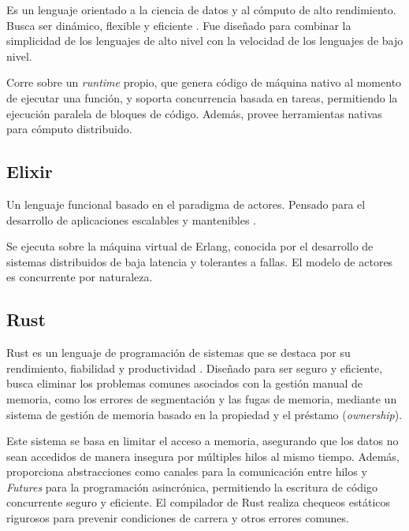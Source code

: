 \documentclass[11pt]{article}
\let\Oldsubsection\subsection
\renewcommand{\subsection}{\FloatBarrier\Oldsubsection}
\newcommand{\english}[1]{\textit{#1}}
\begin{document}
Es un lenguaje orientado a la ciencia de datos y al cómputo de alto rendimiento. Busca ser dinámico, flexible y eficiente \cite{com:julia}. Fue diseñado para combinar la simplicidad de los lenguajes de alto nivel con la velocidad de los lenguajes de bajo nivel.

Corre sobre un \english{runtime} propio, que genera código de máquina nativo al momento de  ejecutar una función, y soporta concurrencia basada en tareas, permitiendo la ejecución paralela de bloques de código. Además, provee herramientas nativas para cómputo distribuido.

\subsection{Elixir}

Un lenguaje funcional basado en el paradigma de actores. Pensado para el desarrollo de aplicaciones escalables y mantenibles \cite{com:elixir}.

Se ejecuta sobre la máquina virtual de Erlang, conocida por el desarrollo de sistemas distribuidos de baja latencia y tolerantes a fallas. El modelo de actores es concurrente por naturaleza.

\subsection{Rust}

Rust es un lenguaje de programación de sistemas que se destaca por su rendimiento, fiabilidad y productividad \cite{com:rust}. Diseñado para ser seguro y eficiente, busca eliminar los problemas comunes asociados con la gestión manual de memoria, como los errores de segmentación y las fugas de memoria, mediante un sistema de gestión de memoria basado en la propiedad y el préstamo (\english{ownership}).

Este sistema se basa en limitar el acceso a memoria, asegurando que los datos no sean accedidos de manera insegura por múltiples hilos al mismo tiempo. Además, proporciona abstracciones como canales para la comunicación entre hilos y \english{Futures} para la programación asincrónica, permitiendo la escritura de código concurrente seguro y eficiente. El compilador de Rust realiza chequeos estáticos rigurosos para prevenir condiciones de carrera y otros errores comunes.
\end{document}
